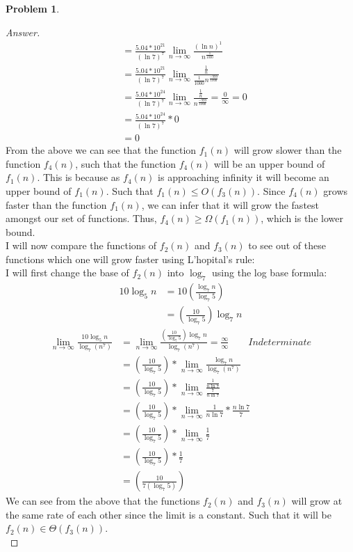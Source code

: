 \documentclass[11pt]{article}
\theoremstyle{definition}
\theoremstyle{definition}
\newtheorem{required}{Problem}
\theoremstyle{definition}
\begin{document}
\begin{required}
\begin{enumerate} [label=(\alph*)]
\begin{proof}[Answer]
\begin{align*}
&= \frac{5.04*10^{21}}{(\ln 7)^{7}}\lim_{n \to \infty} \frac{(\ln n)^{1}}{n^{\frac{1}{1000}}} \\
&= \frac{5.04*10^{21}}{(\ln 7)^{7}}\lim_{n \to \infty} \frac{\frac{1}{n}}{\frac{1}{1000}n^{\frac{-999}{1000}}} \\
&= \frac{5.04*10^{24}}{(\ln 7)^{7}}\lim_{n \to \infty} \frac{\frac{1}{n}}{n^{\frac{-999}{1000}}} = \frac{0}{\infty} = 0\\
&= \frac{5.04*10^{24}}{(\ln 7)^{7}} * 0 \\
&= 0
\end{align*} 
From the above we can see that the function $f_1(n)$ will grow slower than the function $f_4(n)$, such that the function $f_4(n)$ will be an upper bound of $f_1(n)$. This is because as $f_4(n)$ is approaching infinity it will become an upper bound of $f_1(n)$.  Such that  $f_1(n) \leq O(f_3(n))$. Since $f_4(n)$ grows faster than the function $f_1(n)$, we can infer that it will grow the fastest amongst our set of functions. Thus, $f_4(n) \geq \Omega(f_1(n))$, which is the lower bound. \\

I will now compare the functions of $f_2(n)$ and $f_3(n)$ to see out of these functions which one will grow faster using L'hopital's rule: \\
I will first change the base of $f_2(n)$ into $\log_7$ using the log base formula: 
\begin{align*}
10\log_5n &= 10(\frac{\log_7n}{\log_7 5}) \\
&= (\frac{10}{\log_7 5})\log_7 n
\end{align*}
\begin{align*}
\lim_{n \to \infty} \frac{10\log_5n}{\log_7 (n^{7})} &= \lim_{n \to \infty} \frac{(\frac{10}{\log_7 5})\log_7 n}{\log_7 (n^{7})}  = \frac{\infty}{\infty} \qquad Indeterminate  \\
&= (\frac{10}{\log_7 5}) * \lim_{n \to \infty} \frac{\log_7 n}{\log_7 (n^{7})}\\
&= (\frac{10}{\log_7 5}) * \lim_{n \to \infty} \frac{\frac{1}{n\ln7}}{\frac{7}{n\ln7}}\\
&= (\frac{10}{\log_7 5}) * \lim_{n \to \infty} \frac{1}{n\ln7} * \frac{n\ln7}{7}\\
&= (\frac{10}{\log_7 5}) * \lim_{n \to \infty} \frac{1}{7}\\
&= (\frac{10}{\log_7 5}) * \frac{1}{7} \\
&= (\frac{10}{7(\log_7 5)}) 
\end{align*} 
We can see from the above that the functions $f_2(n)$ and $f_3(n)$ will grow at the same rate of each other since the limit is a constant. Such that it will be $f_2(n) \in \Theta(f_3(n))$. \\
    \end{proof}
\end{enumerate}

\end{required}
\end{document}
